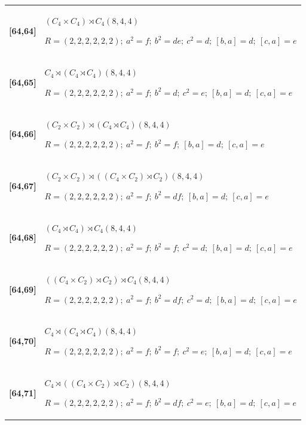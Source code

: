 \documentclass[UTF8,fontset=fandol,11pt,a4paper]{ctexart}
\begin{document}
\begin{longtable}{@{}p{17mm}>{\raggedright\arraybackslash}p{141mm}@{}}
\textbf{[64,64]} & $(C_{4}\times C_{4})\rtimes C_{4}$\quad $(8,4,4)$\par\(R=(2,2,2,2,2,2);\allowbreak\ a^{2}=f;\allowbreak\ b^{2}=de;\allowbreak\ c^{2}=d;\allowbreak\ [b,a]=d;\allowbreak\ [c,a]=e\)\\[3pt]

\textbf{[64,65]} & $C_{4}\rtimes (C_{4}\rtimes C_{4})$\quad $(8,4,4)$\par\(R=(2,2,2,2,2,2);\allowbreak\ a^{2}=f;\allowbreak\ b^{2}=d;\allowbreak\ c^{2}=e;\allowbreak\ [b,a]=d;\allowbreak\ [c,a]=e\)\\[3pt]

\textbf{[64,66]} & $(C_{2}\times C_{2})\rtimes (C_{4}\rtimes C_{4})$\quad $(8,4,4)$\par\(R=(2,2,2,2,2,2);\allowbreak\ a^{2}=f;\allowbreak\ b^{2}=f;\allowbreak\ [b,a]=d;\allowbreak\ [c,a]=e\)\\[3pt]

\textbf{[64,67]} & $(C_{2}\times C_{2})\rtimes ((C_{4}\times C_{2})\rtimes C_{2})$\quad $(8,4,4)$\par\(R=(2,2,2,2,2,2);\allowbreak\ a^{2}=f;\allowbreak\ b^{2}=df;\allowbreak\ [b,a]=d;\allowbreak\ [c,a]=e\)\\[3pt]

\textbf{[64,68]} & $(C_{4}\rtimes C_{4})\rtimes C_{4}$\quad $(8,4,4)$\par\(R=(2,2,2,2,2,2);\allowbreak\ a^{2}=f;\allowbreak\ b^{2}=f;\allowbreak\ c^{2}=d;\allowbreak\ [b,a]=d;\allowbreak\ [c,a]=e\)\\[3pt]

\textbf{[64,69]} & $((C_{4}\times C_{2})\rtimes C_{2})\rtimes C_{4}$\quad $(8,4,4)$\par\(R=(2,2,2,2,2,2);\allowbreak\ a^{2}=f;\allowbreak\ b^{2}=df;\allowbreak\ c^{2}=d;\allowbreak\ [b,a]=d;\allowbreak\ [c,a]=e\)\\[3pt]

\textbf{[64,70]} & $C_{4}\rtimes (C_{4}\rtimes C_{4})$\quad $(8,4,4)$\par\(R=(2,2,2,2,2,2);\allowbreak\ a^{2}=f;\allowbreak\ b^{2}=f;\allowbreak\ c^{2}=e;\allowbreak\ [b,a]=d;\allowbreak\ [c,a]=e\)\\[3pt]

\textbf{[64,71]} & $C_{4}\rtimes ((C_{4}\times C_{2})\rtimes C_{2})$\quad $(8,4,4)$\par\(R=(2,2,2,2,2,2);\allowbreak\ a^{2}=f;\allowbreak\ b^{2}=df;\allowbreak\ c^{2}=e;\allowbreak\ [b,a]=d;\allowbreak\ [c,a]=e\)\\[3pt]


\end{longtable}
\end{document}
